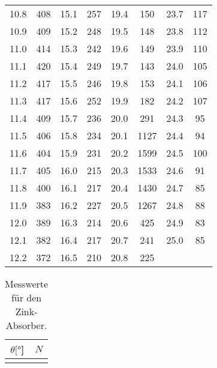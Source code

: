 \begin{table}[H]
\begin{tabular}{S[table-format=2.1] c | S[table-format=2.1] c | S[table-format=2.1] c | S[table-format=2.1] c}
\num{10.8} & \num{408}  &   \num{15.1} & \num{257}  &   \num{19.4} & \num{150}  &   \num{23.7} & \num{117}  \\
\num{10.9} & \num{409}  &   \num{15.2} & \num{248}  &   \num{19.5} & \num{148}  &   \num{23.8} & \num{112}  \\
\num{11.0} & \num{414}  &   \num{15.3} & \num{242}  &   \num{19.6} & \num{149}  &   \num{23.9} & \num{110}  \\
\num{11.1} & \num{420}  &   \num{15.4} & \num{249}  &   \num{19.7} & \num{143}  &   \num{24.0} & \num{105}  \\
\num{11.2} & \num{417}  &   \num{15.5} & \num{246}  &   \num{19.8} & \num{153}  &   \num{24.1} & \num{106}  \\
\num{11.3} & \num{417}  &   \num{15.6} & \num{252}  &   \num{19.9} & \num{182}  &   \num{24.2} & \num{107}  \\
\num{11.4} & \num{409}  &   \num{15.7} & \num{236}  &   \num{20.0} & \num{291}  &   \num{24.3} & \num{95}   \\
\num{11.5} & \num{406}  &   \num{15.8} & \num{234}  &   \num{20.1} & \num{1127} &   \num{24.4} & \num{94}   \\
\num{11.6} & \num{404}  &   \num{15.9} & \num{231}  &   \num{20.2} & \num{1599} &   \num{24.5} & \num{100}  \\
\num{11.7} & \num{405}  &   \num{16.0} & \num{215}  &   \num{20.3} & \num{1533} &   \num{24.6} & \num{91}   \\
\num{11.8} & \num{400}  &   \num{16.1} & \num{217}  &   \num{20.4} & \num{1430} &   \num{24.7} & \num{85}   \\
\num{11.9} & \num{383}  &   \num{16.2} & \num{227}  &   \num{20.5} & \num{1267} &   \num{24.8} & \num{88}   \\
\num{12.0} & \num{389}  &   \num{16.3} & \num{214}  &   \num{20.6} & \num{425}  &   \num{24.9} & \num{83}   \\
\num{12.1} & \num{382}  &   \num{16.4} & \num{217}  &   \num{20.7} & \num{241}  &   \num{25.0} & \num{85}   \\
\num{12.2} & \num{372}  &   \num{16.5} & \num{210}  &   \num{20.8} & \num{225}  &              &            \\
  \bottomrule
  \end{tabular}
\end{table}


\begin{table}[H]
  \centering
  \caption{Messwerte für den Zink-Absorber.}
  \begin{tabular}{S[table-format=2.1] c}
  \toprule
  {$\theta [\si{\degree}$]} &
  {$N$} \\
  \midrule
  \bottomrule
  \end{tabular}
\end{table}

